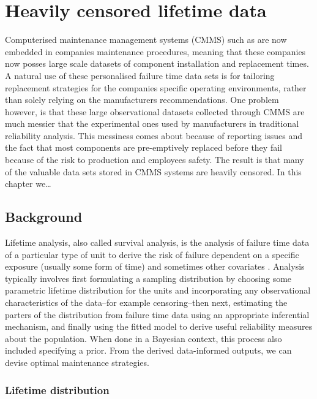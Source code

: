 \chapter{Heavily censored lifetime data}\label{chap:chapter2}

Computerised maintenance management systems (CMMS) such as \cite{sap} are now embedded in companies maintenance procedures, meaning that these companies now posses large scale datasets of component installation and replacement times. A natural use of these personalised failure time data sets is for tailoring replacement strategies for the companies specific operating environments, rather than solely relying on the manufacturers recommendations. One problem however, is that these large observational datasets collected through CMMS are much messier that the experimental ones used by manufacturers in traditional reliability analysis. This messiness comes about because of reporting issues and the fact that most components are pre-emptively replaced before they fail because of the risk to production and employees safety. The result is that many of the valuable data sets stored in CMMS systems are heavily censored. In this chapter we\ldots

\section{Background}

Lifetime analysis, also called survival analysis, is the analysis of failure time data of a particular type of unit to derive the risk of failure dependent on a specific exposure (usually some form of time) and sometimes other covariates \citep{moore}. Analysis typically involves first formulating a sampling distribution by choosing some parametric lifetime distribution for the units and incorporating any observational characteristics of the data--for example censoring--then next, estimating the parters of the distribution from failure time data using an appropriate inferential mechanism, and finally using the fitted model to derive useful reliability measures about the population. When done in a Bayesian context, this process also included specifying a prior. From the derived data-informed outputs, we can devise optimal maintenance strategies.

\subsection{Lifetime distribution}

